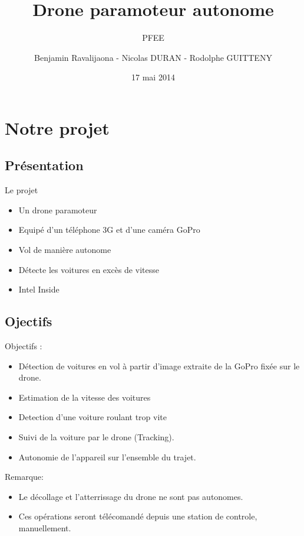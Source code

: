 \documentclass[transparent]{beamer}
\title{Drone paramoteur autonome}
\subtitle{PFEE}
\author{Benjamin  Ravalijaona - Nicolas DURAN - Rodolphe GUITTENY}
\institute{SCIA 2015 \\ EPITA}
\date{17 mai 2014}
\begin{document}
\begin{frame}
	\titlepage
\end{frame}

\begin{frame}
	\tableofcontents
\end{frame}

\section{Notre projet}
\subsection{Présentation}

\begin{frame}

	\begin{block}{Le projet}
			\begin{itemize}
				\item Un drone paramoteur
				\item Equipé d'un téléphone 3G et d'une caméra GoPro
				\item Vol de manière autonome
				\item Détecte les voitures en excès de vitesse
				\item Intel Inside
			\end{itemize}
	\end{block}
\end{frame}

\subsection{Ojectifs}

\begin{frame}
	\begin{block}{Objectifs :}
			\begin{itemize}
				\item Détection de voitures en vol à partir d’image extraite de la GoPro fixée sur le drone.
				\item Estimation de la vitesse des voitures
				\item Detection d'une voiture roulant trop vite
				\item Suivi de la voiture par le drone (Tracking).
				\item Autonomie de l'appareil sur l'ensemble du trajet.
			\end{itemize}
	\end{block}
	\begin{block}{Remarque:}
			\begin{itemize}
				\item Le décollage et l’atterrissage du drone ne sont pas autonomes.
				\item Ces opérations seront télécomandé depuis une station de controle, manuellement.
			\end{itemize}
	\end{block}
\end{frame}
\end{document}
